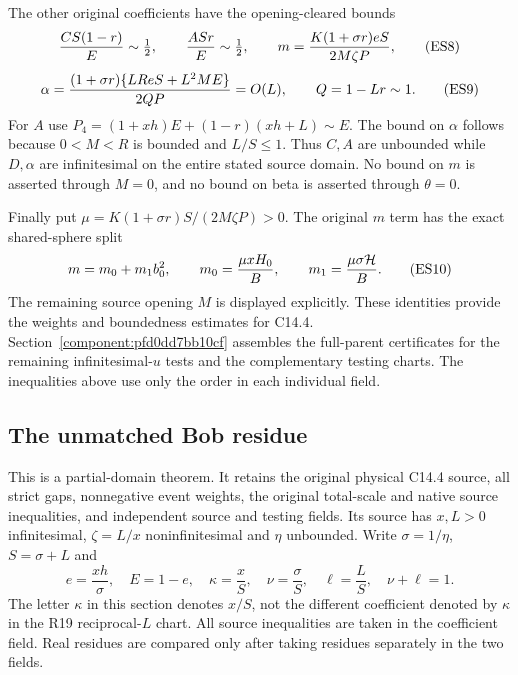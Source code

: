 The other original coefficients have the opening-cleared bounds
\[
 {CS(1-r)\over E}\sim\tfrac12,\qquad
 {ASr\over E}\sim\tfrac12,\qquad
 m={K(1+\sigma r)eS\over2M\zeta P},                  \tag{ES8}
\]
\[
 \alpha={(1+\sigma r)\{LR eS+L^2ME\}\over2QP}
       =O(L),\qquad Q=1-Lr\sim1.                   \tag{ES9}
\]
For $A$ use $P_4=(1+xh)E+(1-r)(xh+L)\sim E$.
The bound on $\alpha$ follows because $0<M<R$ is bounded and
$L/S\le1$. Thus $C,A$ are unbounded while $D,\alpha$ are
infinitesimal on the entire stated source domain. No bound on $m$
is asserted through $M=0$, and no bound on beta is asserted through
$\theta=0$.

Finally put $\mu=K(1+\sigma r)S/(2M\zeta P)>0$. The
original $m$ term has the exact shared-sphere split
\[
 m=m_0+m_1b_0^2,\qquad
 m_0={\mu xH_0\over B},\qquad
 m_1={\mu\sigma\mathcal H\over B}.                  \tag{ES10}
\]
The remaining source opening $M$ is displayed explicitly. These
identities provide the weights and boundedness estimates for C14.4.
Section~\ref{component:pfd0dd7bb10cf} assembles the full-parent
certificates for the remaining infinitesimal-$u$ tests and the
complementary testing charts. The inequalities above use only the
order in each individual field.



\subsection{The unmatched Bob residue}

\label{component:p8c30238a5f7d}

\label{p8c30238a5f7d:sec:recovery-c144-small-e}

This is a partial-domain theorem. It retains the original physical C14.4
source, all strict gaps, nonnegative event weights, the original total-scale
and native source inequalities, and independent source and testing fields.
Its source has $x,L>0$ infinitesimal, $\zeta=L/x$ noninfinitesimal and
$\eta$ unbounded. Write $\sigma=1/\eta$, $S=\sigma+L$ and
\[
 e=\frac{xh}{\sigma},\quad E=1-e,\quad
 \kappa=\frac{x}{S},\quad \nu=\frac{\sigma}{S},\quad
 \ell=\frac{L}{S},\quad \nu+\ell=1.
 \tag{SE1}
\]
The letter $\kappa$ in this section denotes $x/S$, not the different
coefficient denoted by $\kappa$ in the R19 reciprocal-$L$ chart.
All source inequalities are taken in the coefficient field. Real residues
are compared only after taking residues separately in the two fields.

